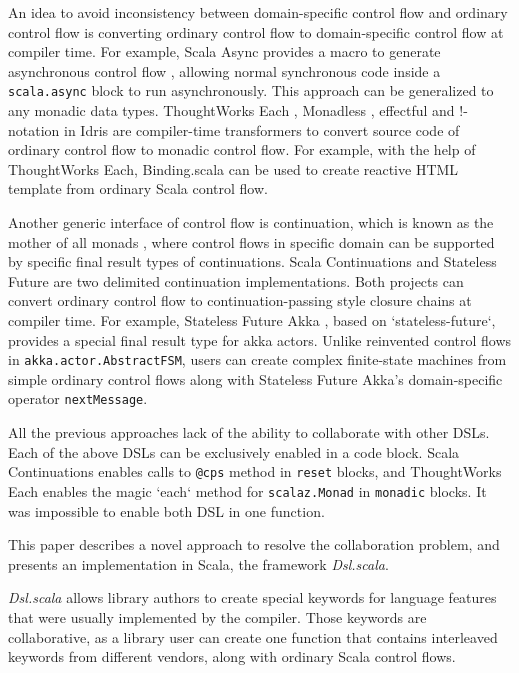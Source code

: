 An idea to avoid inconsistency between domain-specific control flow and ordinary control flow is converting ordinary control flow to domain-specific control flow at compiler time. For example, Scala Async provides a macro to generate asynchronous control flow \cite{haller2013sip}, allowing normal synchronous code inside a \lstinline{scala.async} block to run asynchronously. This approach can be generalized to any monadic data types. ThoughtWorks Each \cite{yangbo2015each}, Monadless \cite{flavio2017monadless}, effectful \cite{crockett2013effectful} and !-notation in Idris \cite{brady2013idris} are compiler-time transformers to convert source code of ordinary control flow to monadic control flow. For example, with the help of ThoughtWorks Each, Binding.scala\cite{yangbo2016binding} can be used to create reactive HTML template from ordinary Scala control flow.

Another generic interface of control flow is continuation, which is known as the mother of all monads \cite{piponi2008mother}, where control flows in specific domain can be supported by specific final result types of continuations. Scala Continuations \cite{rompf2009implementing} and Stateless Future \cite{yangbo2014stateless} are two delimited continuation implementations. Both projects can convert ordinary control flow to continuation-passing style closure chains at compiler time. For example, Stateless Future Akka \cite{yangbo2014statelessfutureakka}, based on `stateless-future`, provides a special final result type for akka actors. Unlike reinvented control flows in \lstinline{akka.actor.AbstractFSM}, users can create complex finite-state machines from simple ordinary control flows along with Stateless Future Akka's domain-specific operator \lstinline{nextMessage}.

All the previous approaches lack of the ability to collaborate with other DSLs. Each of the above DSLs can be exclusively enabled in a code block. Scala Continuations enables calls to \lstinline{@cps} method in \lstinline{reset} blocks, and ThoughtWorks Each enables the magic `each` method for \lstinline{scalaz.Monad} in \lstinline{monadic} blocks. It was impossible to enable both DSL in one function.

This paper describes a novel approach to resolve the collaboration problem, and presents an implementation in Scala, the framework \textit{Dsl.scala}.

\textit{Dsl.scala} allows library authors to create special keywords for language features that were usually implemented by the compiler. Those keywords are collaborative, as a library user can create one function that contains interleaved keywords from different vendors, along with ordinary Scala control flows.

